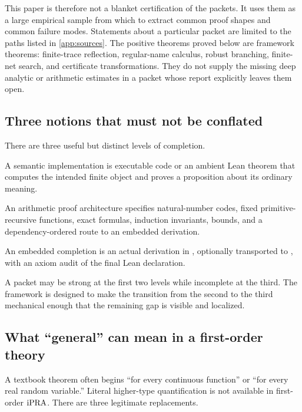 This paper is therefore not a blanket certification of the packets.  It uses
them as a large empirical sample from which to extract common proof shapes and
common failure modes.  Statements about a particular packet are limited to the
paths listed in \cref{app:sources}.  The positive theorems proved below are
framework theorems: finite-trace reflection, regular-name calculus, robust
branching, finite-net search, and certificate transformations.  They do not
supply the missing deep analytic or arithmetic estimates in a packet whose
report explicitly leaves them open.

\subsection{Three notions that must not be conflated}

There are three useful but distinct levels of completion.

\begin{definition}
A semantic implementation is executable code or an ambient Lean theorem that
computes the intended finite object and proves a proposition about its ordinary
meaning.
\end{definition}

\begin{definition}
An arithmetic proof architecture specifies natural-number codes, fixed
primitive-recursive functions, exact formulas, induction invariants, bounds,
and a dependency-ordered route to an embedded derivation.
\end{definition}

\begin{definition}
An embedded completion is an actual derivation in , optionally
transported to , with an axiom audit of the final Lean declaration.
\end{definition}

A packet may be strong at the first two levels while incomplete at the third.
The framework is designed to make the transition from the second to the third
mechanical enough that the remaining gap is visible and localized.

\subsection{What ``general'' can mean in a first-order theory}

A textbook theorem often begins ``for every continuous function'' or ``for
every real random variable.''  Literal higher-type quantification is not
available in first-order \(\mathrm{iPRA}\).  There are three legitimate replacements.

